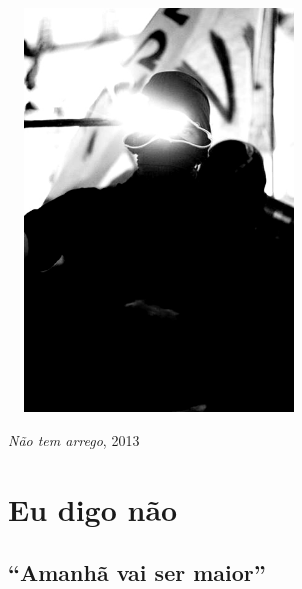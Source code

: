 \begin{center}
\includegraphics[width=8cm,height=10.7cm]{Imgs/img10.jpg}

\emph{Não tem arrego}, 2013
\end{center}

\section{Eu digo não}

\subsection{``Amanhã vai ser maior''}

